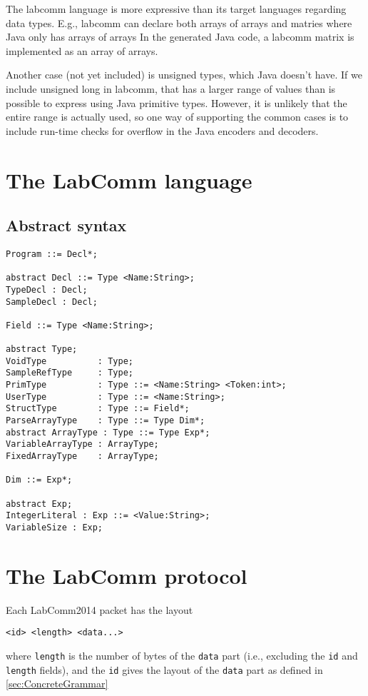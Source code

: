 \documentclass[a4paper]{article}
\begin{document}
The labcomm language is more expressive than its target languages regarding data types.
E.g., labcomm can declare both arrays of arrays and matries where Java only has arrays of arrays
In the generated Java code, a labcomm matrix is implemented as an array of arrays.

Another case (not yet included) is unsigned types, which Java doesn't have. If we include
unsigned long in labcomm, that has a larger range of values than is possible to express using
Java primitive types. However, it is unlikely that the entire range is actually used, so one
way of supporting the common cases is to include run-time checks for overflow in the Java encoders
and decoders.

{}


\appendix
\newpage

\section{The LabComm language}
\label{sec:LanguageGrammar}

\subsection{Abstract syntax}
\begin{verbatim}
Program ::= Decl*;

abstract Decl ::= Type <Name:String>;
TypeDecl : Decl;
SampleDecl : Decl;

Field ::= Type <Name:String>;

abstract Type;
VoidType          : Type;
SampleRefType     : Type;
PrimType          : Type ::= <Name:String> <Token:int>;
UserType          : Type ::= <Name:String>;
StructType        : Type ::= Field*;
ParseArrayType    : Type ::= Type Dim*;
abstract ArrayType : Type ::= Type Exp*;
VariableArrayType : ArrayType;
FixedArrayType    : ArrayType;

Dim ::= Exp*;

abstract Exp;
IntegerLiteral : Exp ::= <Value:String>;
VariableSize : Exp;
\end{verbatim}

\newpage
\section{The LabComm protocol}
\label{sec:ProtocolGrammar}

Each LabComm2014 packet has the layout
\begin{verbatim}
<id> <length> <data...>
\end{verbatim}
where \verb+length+ is the number of bytes of the \verb+data+ part
(i.e., excluding the \verb+id+ and \verb+length+ fields), and 
the \verb+id+ gives the layout of the \verb+data+ part as defined 
in \ref{sec:ConcreteGrammar}
\end{document}
